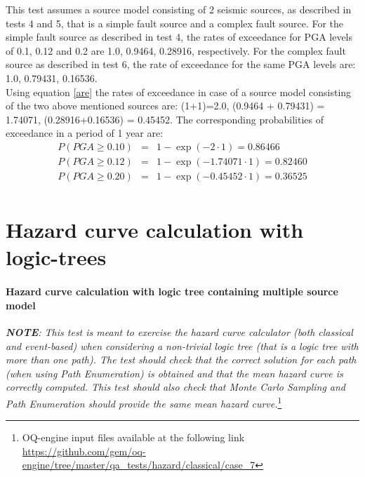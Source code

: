 This test assumes a source model
consisting of 2 seismic sources, as described in tests 4 and 5, that is a simple
fault source and a complex fault source.  For the simple fault source as
described in test 4, the rates of exceedance for PGA levels of 0.1, 0.12 and 0.2
are 1.0, 0.9464, 0.28916, respectively. For the complex fault source as
described in test 6, the rate of exceedance for the same PGA levels are: 1.0,
0.79431, 0.16536.\\ Using equation \ref{are} the rates of exceedance in case of
a source model consisting of the two above mentioned sources are: (1+1)=2.0,
(0.9464 + 0.79431) = 1.74071, (0.28916+0.16536) = 0.45452. The corresponding
probabilities of exceedance in a period of 1 year are:
\begin{eqnarray}
P(PGA \geq 0.10) &=& 1 - \exp(- 2 \cdot 1) = 0.86466 \nonumber \\
P(PGA \geq 0.12) &=& 1 - \exp(- 1.74071 \cdot 1) = 0.82460 \nonumber \\
P(PGA \geq 0.20) &=& 1 - \exp(- 0.45452 \cdot 1) = 0.36525 \nonumber \\
\end{eqnarray}
%
\clearpage
%
\section{Hazard curve calculation with logic-trees}
\paragraph{Hazard curve calculation with logic tree containing
multiple source model} \textit{\textbf{NOTE}: This test is meant to exercise the
    hazard curve calculator (both classical and event-based) when considering a
    non-trivial logic tree (that is a logic tree with more than one path). The
    test should check that the correct solution for each path (when using Path
    Enumeration) is obtained and that the mean hazard curve is correctly
    computed. This test should also check that Monte Carlo Sampling and Path
    Enumeration should provide the same mean hazard curve.}\footnote{
    OQ-engine input files available at the following link
    \url{https://github.com/gem/oq-engine/tree/master/qa_tests/hazard/classical/case_7}}


